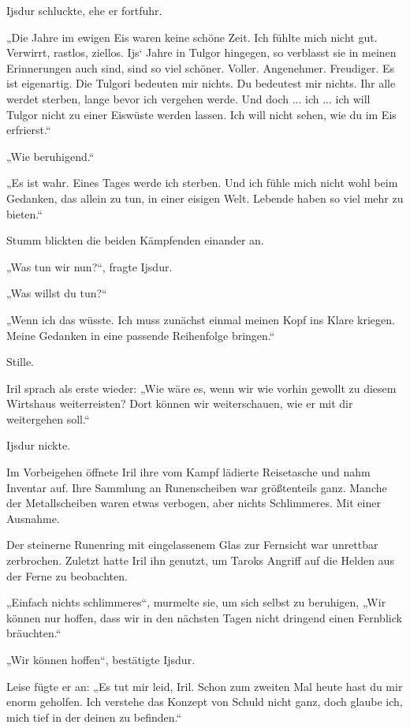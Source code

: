 Ijsdur schluckte, ehe er fortfuhr.

„Die Jahre im ewigen Eis waren keine schöne Zeit. Ich fühlte mich nicht gut. Verwirrt, rastlos, ziellos. Ijs‘ Jahre in Tulgor hingegen, so verblasst sie in meinen Erinnerungen auch sind, sind so viel schöner. Voller. Angenehmer. Freudiger. Es ist eigenartig. Die Tulgori bedeuten mir nichts. Du bedeutest mir nichts. Ihr alle werdet sterben, lange bevor ich vergehen werde. Und doch ... ich ... ich will Tulgor nicht zu einer Eiswüste werden lassen. Ich will nicht sehen, wie du im Eis erfrierst.“

„Wie beruhigend.“

„Es ist wahr. Eines Tages werde ich sterben. Und ich fühle mich nicht wohl beim Gedanken, das allein zu tun, in einer eisigen Welt. Lebende haben so viel mehr zu bieten.“

Stumm blickten die beiden Kämpfenden einander an.

„Was tun wir nun?“, fragte Ijsdur.

„Was willst du tun?“

„Wenn ich das wüsste. Ich muss zunächst einmal meinen Kopf ins Klare kriegen. Meine Gedanken in eine passende Reihenfolge bringen.“

Stille.

Iril sprach als erste wieder: „Wie wäre es, wenn wir wie vorhin gewollt zu diesem Wirtshaus weiterreisten? Dort können wir weiterschauen, wie er mit dir weitergehen soll.“

Ijsdur nickte.



\trennzeichen



Im Vorbeigehen öffnete Iril ihre vom Kampf lädierte Reisetasche und nahm Inventar auf. Ihre Sammlung an Runenscheiben war größtenteils ganz. Manche der Metallscheiben waren etwas verbogen, aber nichts Schlimmeres. Mit einer Ausnahme.

Der steinerne Runenring mit eingelassenem Glas zur Fernsicht war unrettbar zerbrochen. Zuletzt hatte Iril ihn genutzt, um Taroks Angriff auf die Helden aus der Ferne zu beobachten.

„Einfach nichts schlimmeres“, murmelte sie, um sich selbst zu beruhigen, „Wir können nur hoffen, dass wir in den nächsten Tagen nicht dringend einen Fernblick bräuchten.“

„Wir können hoffen“, bestätigte Ijsdur.

Leise fügte er an: „Es tut mir leid, Iril. Schon zum zweiten Mal heute hast du mir enorm geholfen. Ich verstehe das Konzept von Schuld nicht ganz, doch glaube ich, mich tief in der deinen zu befinden.“

